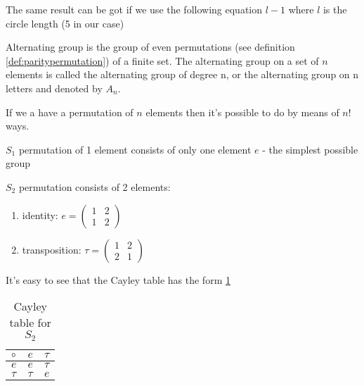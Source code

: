 \begin{appendices}
\begin{example}
  The same result can be got if we use the following equation $l - 1$
  where $l$ is the circle length (5 in our case) 
  \label{ex:paritypermutation}
\end{example}

\begin{definition}
  Alternating group \cite{wiki:alteringgroup} is the group of even
  permutations (see definition \ref{def:paritypermutation}) of a finite 
  set. The alternating group on a set of $n$ elements is called the
  alternating group of degree n, or the alternating group on n letters
  and denoted by $A_n$.
  \label{def:alternatinggroup}
\end{definition}

\begin{example}[$S_n$ group]
  If we a have a permutation of $n$ elements then it's possible to do
  by means of $n!$ ways.
  \label{ex:sngroup}
\end{example}

\begin{example}[$S_1$ group]
  $S_1$ permutation of 1 element consists of only one element $e$ -
  the simplest possible group
  \label{ex:s1group}
\end{example}

\begin{example}[$S_2$ group]
  $S_2$ permutation consists of 2 elements:
  \begin{enumerate}
  \item identity:
    \(
    e = \begin{pmatrix}
      1 & 2 \\
      1 & 2
    \end{pmatrix}
    \) 
  \item transposition:
    \(
    \tau = \begin{pmatrix}
      1 & 2 \\
      2 & 1
    \end{pmatrix}
    \) 
  \end{enumerate}
  It's easy to see that the Cayley table has the form \ref{tab:CayleyS2}
    \begin{table}
    \centering
    \caption{Cayley table for $S_2$}
    \label{tab:CayleyS2}
    \begin{tabular}{l|ll}
      \toprule
      $\circ$ & $e$ & $\tau$ \\
      \midrule
      $e$ & $e$ & $\tau$ \\
      $\tau$ & $\tau$ & $e$ \\
      \bottomrule
    \end{tabular}
    \end{table}
  \label{ex:s2group}
\end{example}


\end{appendices}
